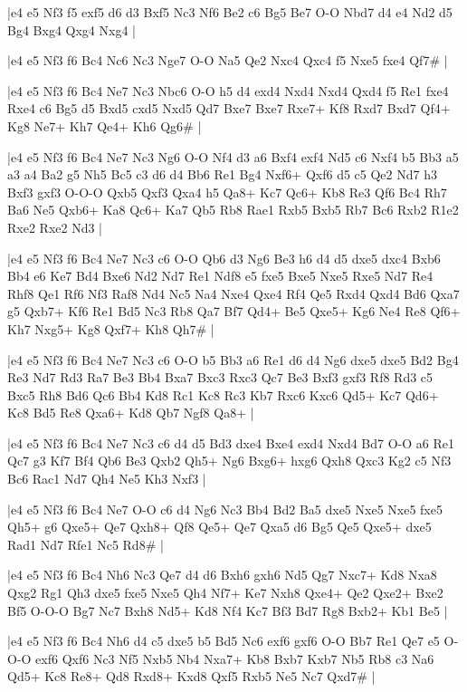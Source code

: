 \whitename{}
\blackname{}
\makegametitle
|e4 e5 Nf3 f5 exf5 d6 d3 Bxf5 Nc3 Nf6 Be2 c6 Bg5 Be7 O-O Nbd7 d4 e4 Nd2 d5 Bg4 Bxg4 Qxg4 Nxg4  |

\whitename{}
\blackname{}
\makegametitle
|e4 e5 Nf3 f6 Bc4 Nc6 Nc3 Nge7 O-O Na5 Qe2 Nxc4 Qxc4 f5 Nxe5 fxe4 Qf7\#  |

\whitename{}
\blackname{}
\makegametitle
|e4 e5 Nf3 f6 Bc4 Ne7 Nc3 Nbc6 O-O h5 d4 exd4 Nxd4 Nxd4 Qxd4 f5 Re1 fxe4 Rxe4 c6 Bg5 d5 Bxd5 cxd5 Nxd5 Qd7 Bxe7 Bxe7 Rxe7+ Kf8 Rxd7 Bxd7 Qf4+ Kg8 Ne7+ Kh7 Qe4+ Kh6 Qg6\#  |

\whitename{}
\blackname{}
\makegametitle
|e4 e5 Nf3 f6 Bc4 Ne7 Nc3 Ng6 O-O Nf4 d3 a6 Bxf4 exf4 Nd5 c6 Nxf4 b5 Bb3 a5 a3 a4 Ba2 g5 Nh5 Bc5 c3 d6 d4 Bb6 Re1 Bg4 Nxf6+ Qxf6 d5 c5 Qe2 Nd7 h3 Bxf3 gxf3 O-O-O Qxb5 Qxf3 Qxa4 h5 Qa8+ Kc7 Qc6+ Kb8 Re3 Qf6 Bc4 Rh7 Ba6 Ne5 Qxb6+ Ka8 Qc6+ Ka7 Qb5 Rb8 Rae1 Rxb5 Bxb5 Rb7 Bc6 Rxb2 R1e2 Rxe2 Rxe2 Nd3  |

\whitename{}
\blackname{}
\makegametitle
|e4 e5 Nf3 f6 Bc4 Ne7 Nc3 c6 O-O Qb6 d3 Ng6 Be3 h6 d4 d5 dxe5 dxc4 Bxb6 Bb4 e6 Ke7 Bd4 Bxe6 Nd2 Nd7 Re1 Ndf8 e5 fxe5 Bxe5 Nxe5 Rxe5 Nd7 Re4 Rhf8 Qe1 Rf6 Nf3 Raf8 Nd4 Nc5 Na4 Nxe4 Qxe4 Rf4 Qe5 Rxd4 Qxd4 Bd6 Qxa7 g5 Qxb7+ Kf6 Re1 Bd5 Nc3 Rb8 Qa7 Bf7 Qd4+ Be5 Qxe5+ Kg6 Ne4 Re8 Qf6+ Kh7 Nxg5+ Kg8 Qxf7+ Kh8 Qh7\#  |

\whitename{}
\blackname{}
\makegametitle
|e4 e5 Nf3 f6 Bc4 Ne7 Nc3 c6 O-O b5 Bb3 a6 Re1 d6 d4 Ng6 dxe5 dxe5 Bd2 Bg4 Re3 Nd7 Rd3 Ra7 Be3 Bb4 Bxa7 Bxc3 Rxc3 Qc7 Be3 Bxf3 gxf3 Rf8 Rd3 c5 Bxc5 Rh8 Bd6 Qc6 Bb4 Kd8 Rc1 Kc8 Rc3 Kb7 Rxc6 Kxc6 Qd5+ Kc7 Qd6+ Kc8 Bd5 Re8 Qxa6+ Kd8 Qb7 Ngf8 Qa8+  |

\whitename{}
\blackname{}
\makegametitle
|e4 e5 Nf3 f6 Bc4 Ne7 Nc3 c6 d4 d5 Bd3 dxe4 Bxe4 exd4 Nxd4 Bd7 O-O a6 Re1 Qc7 g3 Kf7 Bf4 Qb6 Be3 Qxb2 Qh5+ Ng6 Bxg6+ hxg6 Qxh8 Qxc3 Kg2 c5 Nf3 Bc6 Rac1 Nd7 Qh4 Ne5 Kh3 Nxf3  |

\whitename{}
\blackname{}
\makegametitle
|e4 e5 Nf3 f6 Bc4 Ne7 O-O c6 d4 Ng6 Nc3 Bb4 Bd2 Ba5 dxe5 Nxe5 Nxe5 fxe5 Qh5+ g6 Qxe5+ Qe7 Qxh8+ Qf8 Qe5+ Qe7 Qxa5 d6 Bg5 Qe5 Qxe5+ dxe5 Rad1 Nd7 Rfe1 Nc5 Rd8\#  |

\whitename{}
\blackname{}
\makegametitle
|e4 e5 Nf3 f6 Bc4 Nh6 Nc3 Qe7 d4 d6 Bxh6 gxh6 Nd5 Qg7 Nxc7+ Kd8 Nxa8 Qxg2 Rg1 Qh3 dxe5 fxe5 Nxe5 Qh4 Nf7+ Ke7 Nxh8 Qxe4+ Qe2 Qxe2+ Bxe2 Bf5 O-O-O Bg7 Nc7 Bxh8 Nd5+ Kd8 Nf4 Kc7 Bf3 Bd7 Rg8 Bxb2+ Kb1 Be5  |

\whitename{}
\blackname{}
\makegametitle
|e4 e5 Nf3 f6 Bc4 Nh6 d4 c5 dxe5 b5 Bd5 Nc6 exf6 gxf6 O-O Bb7 Re1 Qe7 e5 O-O-O exf6 Qxf6 Nc3 Nf5 Nxb5 Nb4 Nxa7+ Kb8 Bxb7 Kxb7 Nb5 Rb8 c3 Na6 Qd5+ Kc8 Re8+ Qd8 Rxd8+ Kxd8 Qxf5 Rxb5 Ne5 Nc7 Qxd7\#  |


